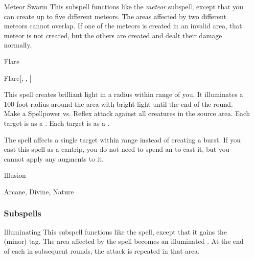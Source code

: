 \begin{ability}[\nth{8}]{Meteor Swarm}
This subspell functions like the \textit{meteor} subspell, except that you can create up to five different meteors.
The areas affected by two different meteors cannot overlap.
If one of the meteors is created in an invalid area, that meteor is not created, but the others are created and dealt their damage normally.
\end{ability}
\vspace{0.25em}

\newpage
\begin{spellsection}{Flare}


\begin{ability}{Flare}[, , ]

This spell creates brilliant light in a \areasmall radius within \rngmed range of you.
It illuminates a 100 foot radius around the area with bright light until the end of the round.
Make a Spellpower vs. Reflex attack against all creatures in the source area.
\hit Each target is \dazzled as a .
\crit Each target is \blinded as a .

\end{ability}



 The spell affects a single target within range instead of creating a burst. If you cast this spell as a cantrip,
you do not need to spend an  to cast it,
but you cannot apply any augments to it.


 Illusion

 Arcane, Divine, Nature
\end{spellsection}


\subsubsection{Subspells}


\begin{ability}[\nth{2}]{Illuminating}
This subspell functions like the  spell, except that it gains the  (minor) tag.
The area affected by the spell becomes an illuminated .
At the end of each  in subsequent rounds, the attack is repeated in that area.
\end{ability}
\vspace{0.25em}


